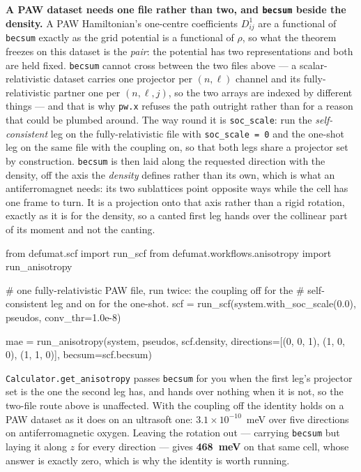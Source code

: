 \documentclass[11pt,a4paper]{article}
\newcommand{\code}[1]{\texttt{\small #1}}
\begin{document}
\textbf{A PAW dataset needs one file rather than two, and \code{becsum} beside
the density.} A PAW Hamiltonian's one-centre coefficients $D^{1}_{ij}$ are a
functional of \code{becsum} exactly as the grid potential is a functional of
$\rho$, so what the theorem freezes on this dataset is the \emph{pair}: the
potential has two representations and both are held fixed. \code{becsum} cannot
cross between the two files above --- a scalar-relativistic dataset carries one
projector per $(n,\ell)$ channel and its fully-relativistic partner one per
$(n,\ell,j)$, so the two arrays are indexed by different things --- and that is
why \code{pw.x} refuses the path outright rather than for a reason that could be
plumbed around. The way round it is \code{soc\_scale}: run the
\emph{self-consistent} leg on the fully-relativistic file with
\code{soc\_scale = 0} and the one-shot leg on the same file with the coupling
on, so that both legs share a projector set by construction. \code{becsum} is
then laid along the requested direction with the density, off the axis the
\emph{density} defines rather than its own, which is what an antiferromagnet
needs: its two sublattices point opposite ways while the cell has one frame to
turn. It is a projection onto that axis rather than a rigid rotation, exactly as
it is for the density, so a canted first leg hands over the collinear part of
its moment and not the canting.

\begin{pycode}
from defumat.scf import run_scf
from defumat.workflows.anisotropy import run_anisotropy

# one fully-relativistic PAW file, run twice: the coupling off for the
# self-consistent leg and on for the one-shot.
scf = run_scf(system.with_soc_scale(0.0), pseudos, conv_thr=1.0e-8)

mae = run_anisotropy(system, pseudos, scf.density,
                     directions=[(0, 0, 1), (1, 0, 0), (1, 1, 0)],
                     becsum=scf.becsum)
\end{pycode}

\noindent \code{Calculator.get\_anisotropy} passes \code{becsum} for you when
the first leg's projector set is the one the second leg has, and hands over
nothing when it is not, so the two-file route above is unaffected. With the
coupling off the identity holds on a PAW dataset as it does on an ultrasoft
one: $3.1\times10^{-10}$~meV over five directions on antiferromagnetic oxygen.
Leaving the rotation out --- carrying \code{becsum} but laying it along $z$ for
every direction --- gives \textbf{468~meV} on that same cell, whose answer is
exactly zero, which is why the identity is worth running.
\end{document}
